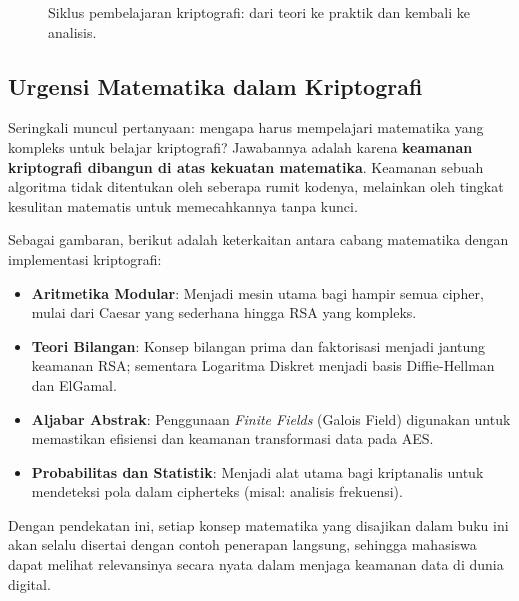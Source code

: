 \begin{figure}[htbp]
  \centering
  \caption{Siklus pembelajaran kriptografi: dari teori ke praktik dan kembali ke analisis.}
\end{figure}

\subsection{Urgensi Matematika dalam Kriptografi}

Seringkali muncul pertanyaan: mengapa harus mempelajari matematika yang kompleks untuk belajar kriptografi? Jawabannya adalah karena \textbf{keamanan kriptografi dibangun di atas kekuatan matematika}. Keamanan sebuah algoritma tidak ditentukan oleh seberapa rumit kodenya, melainkan oleh tingkat kesulitan matematis untuk memecahkannya tanpa kunci.

Sebagai gambaran, berikut adalah keterkaitan antara cabang matematika dengan implementasi kriptografi:
\begin{itemize}
  \item \textbf{Aritmetika Modular}: Menjadi mesin utama bagi hampir semua cipher, mulai dari Caesar yang sederhana hingga RSA yang kompleks.
  \item \textbf{Teori Bilangan}: Konsep bilangan prima dan faktorisasi menjadi jantung keamanan RSA; sementara Logaritma Diskret menjadi basis Diffie-Hellman dan ElGamal.
  \item \textbf{Aljabar Abstrak}: Penggunaan \textit{Finite Fields} (Galois Field) digunakan untuk memastikan efisiensi dan keamanan transformasi data pada AES.
  \item \textbf{Probabilitas dan Statistik}: Menjadi alat utama bagi kriptanalis untuk mendeteksi pola dalam cipherteks (misal: analisis frekuensi).
\end{itemize}

Dengan pendekatan ini, setiap konsep matematika yang disajikan dalam buku ini akan selalu disertai dengan contoh penerapan langsung, sehingga mahasiswa dapat melihat relevansinya secara nyata dalam menjaga keamanan data di dunia digital.

